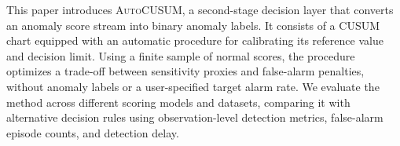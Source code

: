 This paper introduces \textsc{AutoCUSUM}, a second-stage decision layer that converts an anomaly score stream into binary anomaly labels. It consists of a CUSUM chart equipped with an automatic procedure for calibrating its reference value and decision limit. Using a finite sample of normal scores, the procedure optimizes a trade-off between sensitivity proxies and false-alarm penalties, without anomaly labels or a user-specified target alarm rate. We evaluate the method across different scoring models and datasets, comparing it with alternative decision rules using observation-level detection metrics, false-alarm episode counts, and detection delay.

